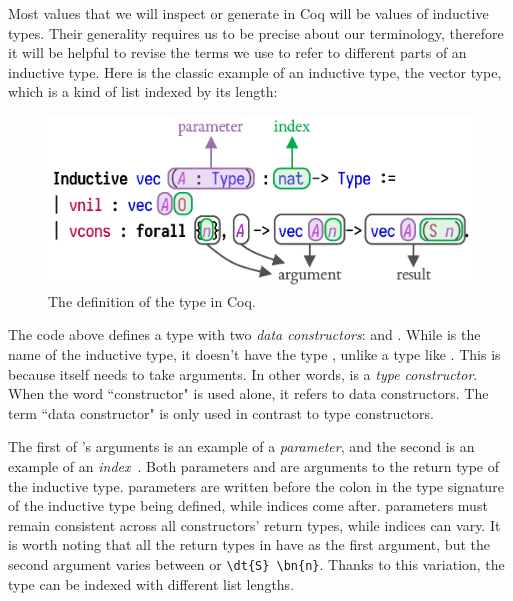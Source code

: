 Most values that we will inspect or generate in Coq will be values of \gls{inductive type}s. Their generality requires us to be precise about our terminology, therefore it will be helpful to revise the terms we use to refer to different parts of an \gls{inductive type}. Here is the classic example of an \gls{inductive type}, the vector type, which is a kind of list indexed by its length:

\renewcommand{\vec}{\hyperref[code:vec]{\ty{vec}}}
\newcommand{\vnil}{\hyperref[code:vec]{\dt{vnil}}}
\newcommand{\vcons}{\hyperref[code:vec]{\dt{vcons}}}
\begin{figure}[H]
\label{code:vec}
\includegraphics[scale=.59]{figures/inductive.pdf}
\centering
\caption{The definition of the  type in Coq.}
\end{figure}


The code above defines a type \vec{} with two \emph{\glspl{data constructor}}: \vnil{} and \vcons{}. While \vec{} is the name of the inductive type, it doesn't have the type , unlike a type like . This is because \vec{} itself needs to take arguments. In other words, \vec{} is a \emph{\gls{type constructor}}. When the word ``constructor" is used alone, it refers to data constructors. The term ``\gls{data constructor}" is only used in contrast to type constructors.

The first of \vec{}’s arguments is an example of a \emph{\gls{parameter}}, and the second is an example of an \emph{\gls{index}}~\cite{dybjer1994}. Both \gls{parameter}s and  are arguments to the return type of the \gls{inductive type}. \Gls{parameter}s are written before the colon in the type signature of the \gls{inductive type} being defined, while indices come after. \Gls{parameter}s must remain consistent across all constructors' return types, while indices can vary. It is worth noting that all the return types in \vec{} have  as the first argument, but the second argument varies between  or \Verb|\dt{S} \bn{n}|. Thanks to this variation, the \vec{} type can be indexed with different list lengths.


